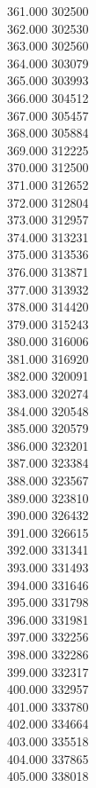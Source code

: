 { 361.000	302500 \\
 362.000	302530 \\
 363.000	302560 \\
 364.000	303079 \\
 365.000	303993 \\
 366.000	304512 \\
 367.000	305457 \\
 368.000	305884 \\
 369.000	312225 \\
 370.000	312500 \\
 371.000	312652 \\
 372.000	312804 \\
 373.000	312957 \\
 374.000	313231 \\
 375.000	313536 \\
 376.000	313871 \\
 377.000	313932 \\
 378.000	314420 \\
 379.000	315243 \\
 380.000	316006 \\
 381.000	316920 \\
 382.000	320091 \\
 383.000	320274 \\
 384.000	320548 \\
 385.000	320579 \\
 386.000	323201 \\
 387.000	323384 \\
 388.000	323567 \\
 389.000	323810 \\
 390.000	326432 \\
 391.000	326615 \\
 392.000	331341 \\
 393.000	331493 \\
 394.000	331646 \\
 395.000	331798 \\
 396.000	331981 \\
 397.000	332256 \\
 398.000	332286 \\
 399.000	332317 \\
 400.000	332957 \\
 401.000	333780 \\
 402.000	334664 \\
 403.000	335518 \\
 404.000	337865 \\
 405.000	338018 \\
}
